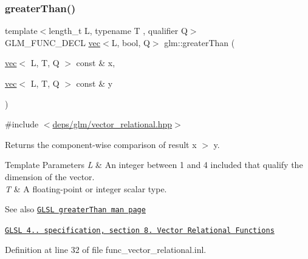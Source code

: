 \subsubsection{\texorpdfstring{greater\+Than()}{greaterThan()}}
{\footnotesize\ttfamily template$<$length\+\_\+t L, typename T , qualifier Q$>$ \\
G\+L\+M\+\_\+\+F\+U\+N\+C\+\_\+\+D\+E\+CL \hyperlink{structglm_1_1vec}{vec}$<$L, bool, Q$>$ glm\+::greater\+Than (\begin{DoxyParamCaption}\item[{\hyperlink{structglm_1_1vec}{vec}$<$ L, T, Q $>$ const \&}]{x,  }\item[{\hyperlink{structglm_1_1vec}{vec}$<$ L, T, Q $>$ const \&}]{y }\end{DoxyParamCaption})}



{\ttfamily \#include $<$\hyperlink{vector__relational_8hpp}{deps/glm/vector\+\_\+relational.\+hpp}$>$}

Returns the component-\/wise comparison of result x $>$ y.


\begin{DoxyTemplParams}{Template Parameters}
{\em L} & An integer between 1 and 4 included that qualify the dimension of the vector. \\
\hline
{\em T} & A floating-\/point or integer scalar type.\\
\hline
\end{DoxyTemplParams}
\begin{DoxySeeAlso}{See also}
\href{http://www.opengl.org/sdk/docs/manglsl/xhtml/greaterThan.xml}{\tt G\+L\+SL greater\+Than man page} 

\href{http://www.opengl.org/registry/doc/GLSLangSpec.4.20.8.pdf}{\tt G\+L\+SL 4.. specification, section 8. Vector Relational Functions} 
\end{DoxySeeAlso}


Definition at line 32 of file func\+\_\+vector\+\_\+relational.\+inl.

\mbox{\label{group__core__func__vector__relational_ga271038c5290184127754bda0ae91a5bd}} 
